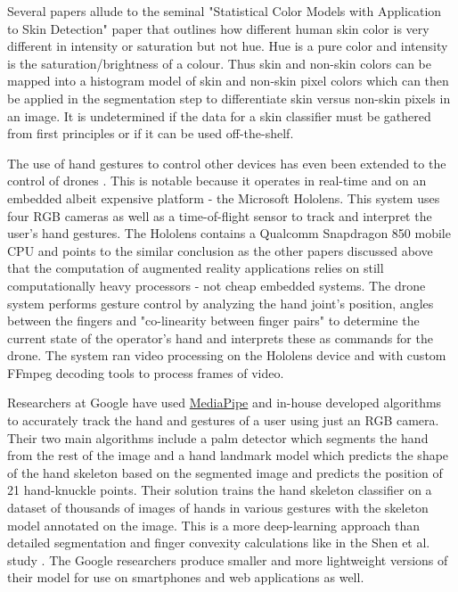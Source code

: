 Several papers allude to the seminal "Statistical Color Models with Application to Skin Detection" paper \cite{jones_skin_color} that outlines how different human skin color is very different in intensity or saturation but not hue. Hue is a pure color and intensity is the saturation/brightness of a colour. Thus skin and non-skin colors can be mapped into a histogram model of skin and non-skin pixel colors which can then be applied in the segmentation step to differentiate skin versus non-skin pixels in an image. It is undetermined if the data for a skin classifier must be gathered from first principles or if it can be used off-the-shelf. \newline

The use of hand gestures to control other devices has even been extended to the control of drones \cite{drones_hololens}. This is notable because it operates in real-time and on an embedded albeit expensive platform - the Microsoft Hololens. This system uses four RGB cameras as well as a time-of-flight sensor to track and interpret the user's hand gestures. The Hololens contains a Qualcomm Snapdragon 850 mobile CPU and points to the similar conclusion as the other papers discussed above that the computation of augmented reality applications relies on still computationally heavy processors - not cheap embedded systems. The drone system performs gesture control by analyzing the hand joint's position, angles between the fingers and "co-linearity between finger pairs" to determine the current state of the operator's hand and interprets these as commands for the drone. The system ran video processing on the Hololens device and with custom FFmpeg decoding tools to process frames of video. \newline

Researchers at Google have used \href{https://google.github.io/mediapipe/solutions/hands}{MediaPipe} and in-house developed algorithms to accurately track the hand and gestures of a user using just an RGB camera. \cite{mediapipe_hands} Their two main algorithms include a palm detector which segments the hand from the rest of the image and a hand landmark model which predicts the shape of the hand skeleton based on the segmented image and predicts the position of 21 hand-knuckle points. Their solution trains the hand skeleton classifier on a dataset of thousands of images of hands in various gestures with the skeleton model annotated on the image. This is a more deep-learning approach than detailed segmentation and finger convexity calculations like in the Shen et al. study \cite{hand_ar_shen}. The Google researchers produce smaller and more lightweight versions of their model for use on smartphones and web applications as well. \newline

